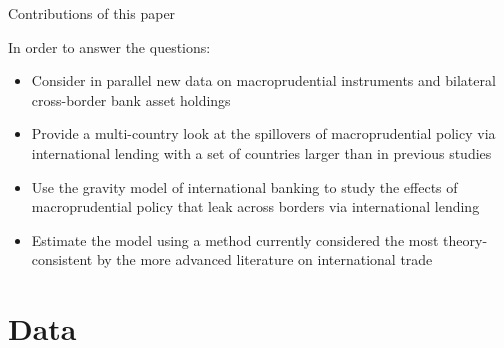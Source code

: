 \documentclass{beamer}
\begin{document}
\begin{frame}{Contributions of this paper}

\begin{block}{In order to answer the questions:}
\begin{itemize}
\item Consider in parallel new data on macroprudential instruments and bilateral cross-border bank asset holdings
\item Provide a multi-country look at the spillovers of macroprudential policy via international lending with a set of countries larger than in previous studies
\item Use the gravity model of international banking to study the effects of macroprudential policy that leak across borders via international lending 
\item Estimate the model using a method currently considered the most theory-consistent by the more advanced literature on international trade
\end{itemize}
\end{block}

\end{frame}

\section{Data}

\end{document}
